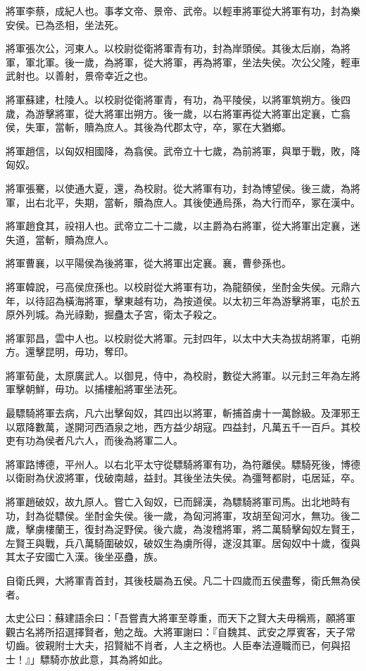 \begin{pinyinscope}
將軍李蔡，成紀人也。事孝文帝、景帝、武帝。以輕車將軍從大將軍有功，封為樂安侯。已為丞相，坐法死。

將軍張次公，河東人。以校尉從衛將軍青有功，封為岸頭侯。其後太后崩，為將軍，軍北軍。後一歲，為將軍，從大將軍，再為將軍，坐法失侯。次公父隆，輕車武射也。以善射，景帝幸近之也。

將軍蘇建，杜陵人。以校尉從衛將軍青，有功，為平陵侯，以將軍筑朔方。後四歲，為游擊將軍，從大將軍出朔方。後一歲，以右將軍再從大將軍出定襄，亡翕侯，失軍，當斬，贖為庶人。其後為代郡太守，卒，冢在大猶鄉。

將軍趙信，以匈奴相國降，為翕侯。武帝立十七歲，為前將軍，與單于戰，敗，降匈奴。

將軍張騫，以使通大夏，還，為校尉。從大將軍有功，封為博望侯。後三歲，為將軍，出右北平，失期，當斬，贖為庶人。其後使通烏孫，為大行而卒，冢在漢中。

將軍趙食其，祋祤人也。武帝立二十二歲，以主爵為右將軍，從大將軍出定襄，迷失道，當斬，贖為庶人。

將軍曹襄，以平陽侯為後將軍，從大將軍出定襄。襄，曹參孫也。

將軍韓說，弓高侯庶孫也。以校尉從大將軍有功，為龍頟侯，坐酎金失侯。元鼎六年，以待詔為橫海將軍，擊東越有功，為按道侯。以太初三年為游擊將軍，屯於五原外列城。為光祿勳，掘蠱太子宮，衛太子殺之。

將軍郭昌，雲中人也。以校尉從大將軍。元封四年，以太中大夫為拔胡將軍，屯朔方。還擊昆明，毋功，奪印。

將軍荀彘，太原廣武人。以御見，侍中，為校尉，數從大將軍。以元封三年為左將軍擊朝鮮，毋功。以捕樓船將軍坐法死。

最驃騎將軍去病，凡六出擊匈奴，其四出以將軍，斬捕首虜十一萬餘級。及渾邪王以眾降數萬，遂開河西酒泉之地，西方益少胡寇。四益封，凡萬五千一百戶。其校吏有功為侯者凡六人，而後為將軍二人。

將軍路博德，平州人。以右北平太守從驃騎將軍有功，為符離侯。驃騎死後，博德以衛尉為伏波將軍，伐破南越，益封。其後坐法失侯。為彊弩都尉，屯居延，卒。

將軍趙破奴，故九原人。嘗亡入匈奴，已而歸漢，為驃騎將軍司馬。出北地時有功，封為從驃侯。坐酎金失侯。後一歲，為匈河將軍，攻胡至匈河水，無功。後二歲，擊虜樓蘭王，復封為浞野侯。後六歲，為浚稽將軍，將二萬騎擊匈奴左賢王，左賢王與戰，兵八萬騎圍破奴，破奴生為虜所得，遂沒其軍。居匈奴中十歲，復與其太子安國亡入漢。後坐巫蠱，族。

自衛氏興，大將軍青首封，其後枝屬為五侯。凡二十四歲而五侯盡奪，衛氏無為侯者。

太史公曰：蘇建語余曰：「吾嘗責大將軍至尊重，而天下之賢大夫毋稱焉，願將軍觀古名將所招選擇賢者，勉之哉。大將軍謝曰：『自魏其、武安之厚賓客，天子常切齒。彼親附士大夫，招賢絀不肖者，人主之柄也。人臣奉法遵職而已，何與招士！』」驃騎亦放此意，其為將如此。


\end{pinyinscope}